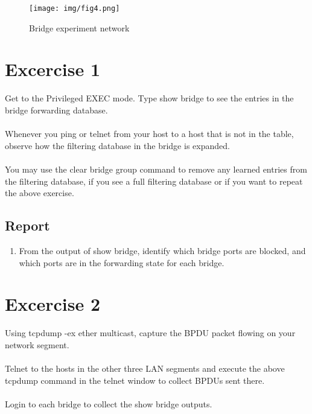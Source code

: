 \documentclass[10pt,a4paper]{article}
\numberwithin{equation}{section}
\numberwithin{figure}{section}
\numberwithin{table}{section}
\begin{document}
\begin{figure}[H]
    \centering
    \texttt{[image: img/fig4.png]}
    \caption{Bridge experiment network}
    \label{fig:bridge-ex}
\end{figure}

\iffalse
\section{Excercise 1}
   Get to the Privileged EXEC mode. Type show bridge to see the entries in the bridge forwarding database. \\ 
\\
Whenever you ping or telnet from your host to a host that is not in the table, observe how the filtering database in the bridge is expanded. \\
\\
You may use the clear bridge group command to remove any learned entries from the filtering database, if you see a full filtering database or if you want to repeat the above exercise. 

   \subsection*{Report}
    \begin{enumerate}
        \item From the output of show bridge, identify which bridge ports are blocked, and which ports are in the forwarding state for each bridge.
    \end{enumerate}

\section*{Excercise 2}
   Using tcpdump -ex ether multicast, capture the BPDU packet flowing on your network segment. \\
\\
Telnet to the hosts in the other three LAN segments and execute the above tcpdump command in the telnet window to collect BPDUs sent there. \\
\\
Login to each bridge to collect the show bridge outputs.
\end{document}
